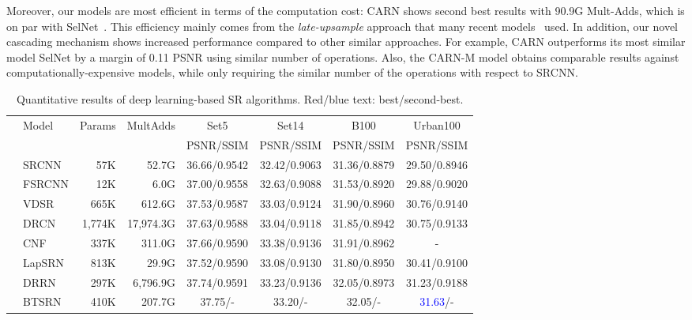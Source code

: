 \documentclass[runningheads]{llncs}
\newcommand{\blue}[1]{\textcolor{blue}{#1}}
\newcommand\Tstrut{\rule{0pt}{2.5ex}}
\newcommand\Bstrut{\rule[-1ex]{0pt}{0pt}}
\def\HS{\hspace{\fontdimen2\font}}
\def\HSE{\HS\HS\HS\HS\HS\HS\HS\HS}
\begin{document}
Moreover, our models are most efficient in terms of the computation cost: CARN shows second best results with 90.9G Mult-Adds, which is on par with SelNet~\cite{selnet}. This efficiency mainly comes from the \textit{late-upsample} approach that many recent models~\cite{srdense,lapsrn2017,fsrcnn2016} used. In addition, our novel cascading mechanism shows increased performance compared to other similar approaches. For example, CARN outperforms its most similar model SelNet by a margin of 0.11 PSNR using similar number of operations.
Also, the CARN-M model obtains comparable results against computationally-expensive models, while only requiring the similar number of the operations with respect to SRCNN.

\begin{table}[t]
\scriptsize
\setlength{\tabcolsep}{2pt}
\caption{Quantitative results of deep learning-based SR algorithms. Red/blue text: best/second-best.}
\begin{center}
\begin{tabular}{c l r r c c c c}
\hline\Tstrut
\multirow{2}{*}{Scale} & \multirow{2}{*}{Model} & \multirow{2}{*}{Params} & \multirow{2}{*}{MultAdds} & Set5 & Set14 & B100 & Urban100 \\
&  &  & & PSNR/SSIM & PSNR/SSIM & PSNR/SSIM & PSNR/SSIM
\Bstrut\\\hline\Tstrut
\multirow{12}{*}{2} & SRCNN\cite{srcnn2014}
                           & 57K    & 52.7G    & 36.66/0.9542 & 32.42/0.9063 & 31.36/0.8879 & 29.50/0.8946 \\
& FSRCNN\cite{fsrcnn2016}  & 12K    & 6.0G     & 37.00/0.9558 & 32.63/0.9088 & 31.53/0.8920 & 29.88/0.9020 \\
& VDSR\cite{vdsr2016}      & 665K   & 612.6G   & 37.53/0.9587 & 33.03/0.9124 & 31.90/0.8960 & 30.76/0.9140 \\
& DRCN\cite{drcn2016}      & 1,774K & 17,974.3G & 37.63/0.9588 & 33.04/0.9118 & 31.85/0.8942 & 30.75/0.9133 \\
& CNF\cite{cnf2017}        & 337K   & 311.0G   & 37.66/0.9590 & 33.38/0.9136 & 31.91/0.8962 & -\\
& LapSRN\cite{lapsrn2017}  & 813K   & 29.9G    & 37.52/0.9590 & 33.08/0.9130 & 31.80/0.8950 & 30.41/0.9100 \\
& DRRN\cite{drnn2017}      & 297K   & 6,796.9G & 37.74/0.9591 & 33.23/0.9136 & 32.05/0.8973 & 31.23/0.9188 \\
& BTSRN\cite{btsrn2017}    & 410K   & 207.7G   & 37.75/-\HSE  & 33.20/-\HSE  & 32.05/-\HSE  & \blue{31.63}/-\HSE \\

\end{tabular}
\end{center}
\end{table}
\end{document}
